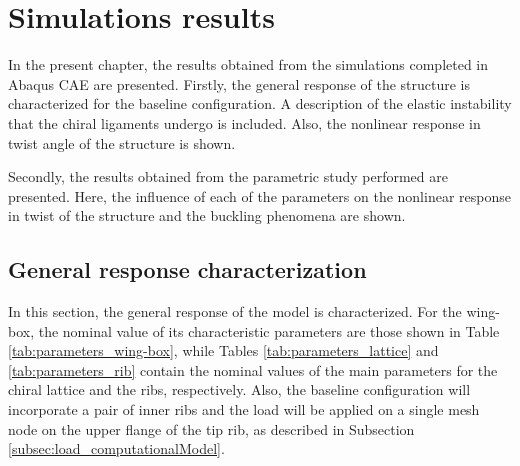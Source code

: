 \chapter{Simulations results} \label{chap:results_sim}
  
  In the present chapter, the results obtained from the simulations completed in Abaqus CAE are presented. Firstly, the general response of the structure is characterized for the baseline configuration. A description of the elastic instability that the chiral ligaments undergo is included. Also, the nonlinear response in twist angle of the structure is shown.

  Secondly, the results obtained from the parametric study performed are presented. Here, the influence of each of the parameters on the nonlinear response in twist of the structure and the buckling phenomena are shown.

\section{General response characterization} \label{sec:generalResponseCharact_results_sim}

  In this section, the general response of the model is characterized. For the wing-box, the nominal value of its characteristic parameters are those shown in Table \ref{tab:parameters_wing-box}, while Tables \ref{tab:parameters_lattice} and \ref{tab:parameters_rib} contain the nominal values of the main parameters for the chiral lattice and the ribs, respectively. Also, the baseline configuration will incorporate a pair of inner ribs and the load will be applied on a single mesh node on the upper flange of the tip rib, as described in Subsection \ref{subsec:load_computationalModel}.

